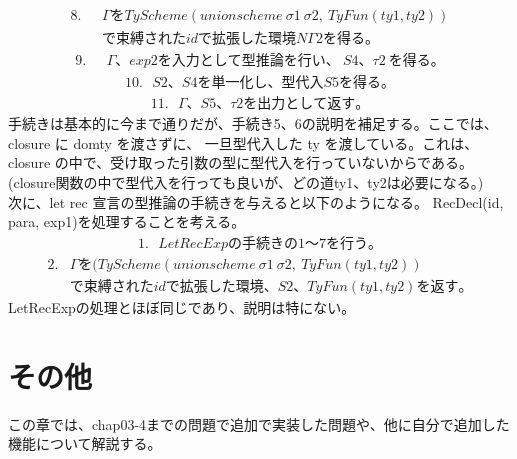\documentclass{jreport}
\begin{document}
\begin{equation}
  \begin{split}
    8. \ \ \ &\Gamma をTyScheme(unionscheme \ \sigma1 \  \sigma2, \ TyFun(ty1, ty2)) \\ &
    で束縛されたidで拡張した環境N\Gamma2を得る。
  \end{split}
\end{equation}
\begin{equation}
  \begin{split}
    9. \ \ \ &\Gamma、exp2 を入力として型推論を行い、\ S4、\tau2 \ を得る。
  \end{split}
\end{equation}
\begin{equation}
  \begin{split}
    10. \ \ \ S2、S4を単一化し、型代入S5を得る。
  \end{split}
\end{equation}
\begin{equation}
  \begin{split}
    11. \ \ \ \Gamma、S5、\tau2 を出力として返す。
  \end{split}
\end{equation}
手続きは基本的に今まで通りだが、手続き5、6の説明を補足する。ここでは、closure に domty を渡さずに、
一旦型代入した ty を渡している。これは、closure の中で、受け取った引数の型に型代入を行っていないからである。
(closure関数の中で型代入を行っても良いが、どの道ty1、ty2は必要になる。)
\\
次に、let rec 宣言の型推論の手続きを与えると以下のようになる。
RecDecl(id, para, exp1)を処理することを考える。
\begin{equation}
  \begin{split}
    1. \ \ \ LetRecExpの手続きの1〜7を行う。
  \end{split}
\end{equation}
\begin{equation}
  \begin{split}
    2. &\Gamma を(TyScheme(unionscheme \ \sigma1 \ \sigma2, \ TyFun(ty1, ty2)) \\ &
    で束縛されたidで拡張した環境、S2、TyFun(ty1, ty2) を返す。
  \end{split}
\end{equation}
LetRecExpの処理とほぼ同じであり、説明は特にない。
\chapter{その他}
この章では、chap03-4までの問題で追加で実装した問題や、他に自分で追加した機能について解説する。
\end{document}
